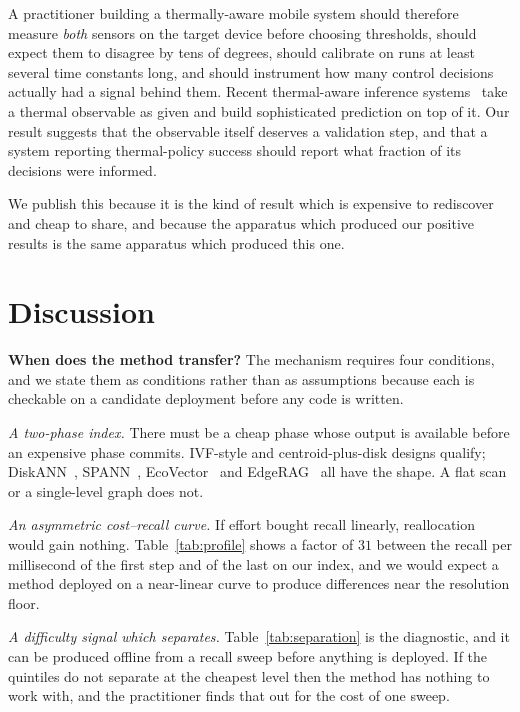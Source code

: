 \documentclass[journal]{IEEEtran}
\begin{document}
A practitioner building a thermally-aware mobile system should therefore
measure \emph{both} sensors on the target device before choosing
thresholds, should expect them to disagree by tens of degrees, should
calibrate on runs at least several time constants long, and should
instrument how many control decisions actually had a signal behind them.
Recent thermal-aware inference systems~\cite{zou2026enerinfer,lu2026therme}
take a thermal observable as given and build sophisticated prediction on top
of it. Our result suggests that the observable itself deserves a validation
step, and that a system reporting thermal-policy success should report what
fraction of its decisions were informed.

We publish this because it is the kind of result which is expensive to
rediscover and cheap to share, and because the apparatus which produced our
positive results is the same apparatus which produced this one.

\section{Discussion}
\label{sec:discussion}

\textbf{When does the method transfer?} The mechanism requires four
conditions, and we state them as conditions rather than as assumptions
because each is checkable on a candidate deployment before any code is
written.

\emph{A two-phase index.} There must be a cheap phase whose output is
available before an expensive phase commits. IVF-style and
centroid-plus-disk designs qualify; DiskANN~\cite{subramanya2019diskann},
SPANN~\cite{chen2021spann}, EcoVector~\cite{park2025mobilerag} and
EdgeRAG~\cite{seemakhupt2024edgerag} all have the shape. A flat scan or a
single-level graph does not.

\emph{An asymmetric cost--recall curve.} If effort bought recall linearly,
reallocation would gain nothing. Table~\ref{tab:profile} shows a factor of
$31$ between the recall per millisecond of the first step and of the last
on our index, and we would expect a method deployed on a near-linear curve
to produce differences near the resolution floor.

\emph{A difficulty signal which separates.} Table~\ref{tab:separation} is
the diagnostic, and it can be produced offline from a recall sweep before
anything is deployed. If the quintiles do not separate at the cheapest
level then the method has nothing to work with, and the practitioner finds
that out for the cost of one sweep.
\end{document}
